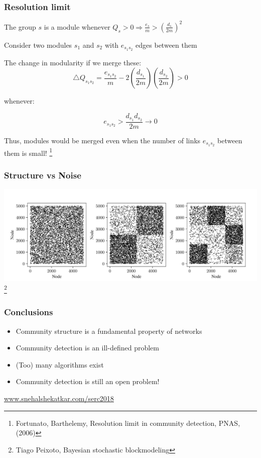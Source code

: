 \documentclass{beamer}
\begin{document}
\begin{frame}
    \frametitle{Resolution limit}
    The group $s$ is a module whenever $Q_s > 0 \Rightarrow \frac{e_s}{m}>\left(\frac{d_s}{2m}\right)^2$

    \vspace{2em} 
    \justifying
    Consider two modules $s_1$ and $s_2$ with $e_{s_1s_2}$ edges between them

    The change in modularity if we merge these:
    $$\triangle Q_{s_1s_2} = \frac{e_{s_1s_2}}{m}-2\left(\frac{d_{s_1}}{2m}\right)\left(\frac{d_{s_2}}{2m}\right)>0$$

    whenever:

    $$e_{s_1s_2} > \frac{d_{s_1}d_{s_2}}{2m}\rightarrow 0$$

    Thus, modules would be merged even when the number of links $e_{s_1s_2}$ between them is small!
\footnote{Fortunato, Barthelemy, Resolution limit in community detection, PNAS, (2006)}
\end{frame}
\begin{frame}
    \frametitle{Structure vs Noise}
    \centering
    \includegraphics[width=\columnwidth]{three_adjacency.png}
\footnote{Tiago Peixoto, Bayesian stochastic blockmodeling}
\end{frame}
\begin{frame}
    \frametitle{Conclusions}
    \centering
    \begin{itemize}
    \setlength\itemsep{1em}
        \item{Community structure is a fundamental property of networks}
        \item{Community detection is an ill-defined problem}
        \item{(Too) many algorithms exist}
        \item{Community detection is still an open problem!}
    \end{itemize}
    \vspace{2em}
    \url{www.snehalshekatkar.com/serc2018}
\end{frame}
\end{document}
